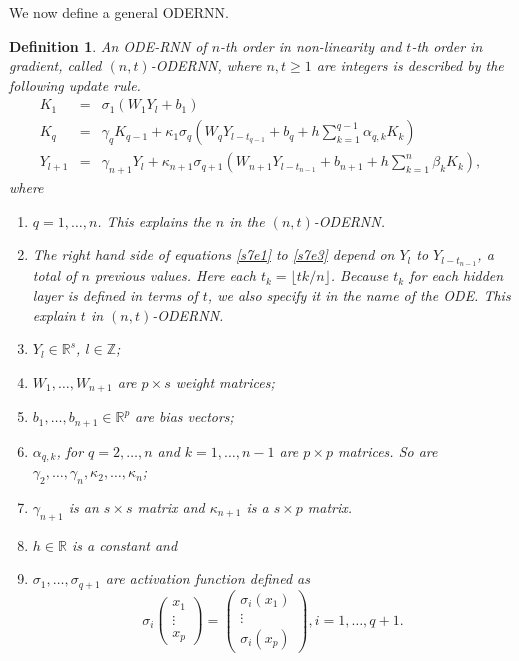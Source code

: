 \documentclass{article}
\numberwithin{equation}{section}
\newtheorem{defn}{Definition}
\begin{document}
We now define a general ODERNN\cite{niu2019recurrent}.
\begin{defn}\label{s7d1}
An ODE-RNN of $n$-th order in non-linearity and $t$-th order in gradient,
called $(n,t)$-ODERNN, where $n, t \ge 1$ are integers is described by
the following update rule.
\begin{eqnarray}
K_1 &=& \sigma_1(W_1Y_l + b_1) \label{s7e1} \\
K_q &=& \gamma_q K_{q-1} + \kappa_1\sigma_q\left(
 W_qY_{l-t_{q-1}}+b_q+h\sum_{k=1}^{q-1}\alpha_{q,k}K_k\right)\label{s7e2}\\
Y_{l+1} &=& \gamma_{n+1}Y_l + \kappa_{n+1}\sigma_{q+1}\left(
 W_{n+1}Y_{l-t_{n-1}}+b_{n+1}+h\sum_{k=1}^n\beta_kK_k
 \right)\label{s7e3},
\end{eqnarray}
where
\begin{enumerate}
\item $q = 1, \ldots, n$. This explains the $n$ in the $(n,t)$-ODERNN.
\item The right hand side of equations \eqref{s7e1} to \eqref{s7e3} 
depend on $Y_l$ to $Y_{l - t_{n-1}}$, a total of $n$ previous values.
Here each $t_k = \lfloor tk/n\rfloor$. Because $t_k$ for each hidden layer
is defined in terms of $t$, we also specify it in the name of the ODE. 
This explain $t$ in $(n, t)$-ODERNN.
\item $Y_l \in \mathbb{R}^s$, $l \in \mathbb{Z}$;
\item $W_1,\ldots, W_{n+1}$ are $p \times s$ weight matrices; 
\item $b_1,\ldots, b_{n+1} \in \mathbb{R}^p$ are bias vectors; 
\item $\alpha_{q, k}$, for $q = 2, \ldots, n$ and $k = 1, \ldots, n - 1$
are $p \times p$ matrices. So are $\gamma_2, \ldots, \gamma_{n}, \kappa_2, 
\ldots, \kappa_{n}$;
\item $\gamma_{n+1}$ is an $s \times s$ matrix and $\kappa_{n+1}$ is a 
$s \times p$ matrix.
\item $h \in \mathbb{R}$ is a constant and
\item $\sigma_1, \ldots, \sigma_{q+1}$ are activation function defined as
\[
\sigma_i\begin{pmatrix}x_1 \\ \vdots \\ x_p\end{pmatrix} = 
\begin{pmatrix}\sigma_i(x_1) \\ \vdots \\ \sigma_i(x_p)\end{pmatrix},
i = 1, \ldots, q+1.
\]
\end{enumerate}
\end{defn}
\end{document}
